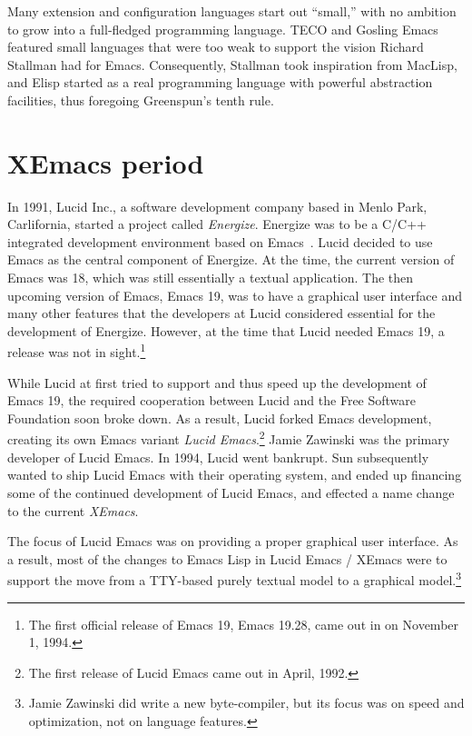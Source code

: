 \documentclass[format=acmsmall, review=false, screen=true]{acmart}
\newcommand \Elisp {Elisp}
\begin{document}

Many extension and configuration languages start out ``small,'' with
no ambition to grow into a full-fledged programming language.  TECO
and Gosling Emacs featured small languages that were too weak to
support the vision Richard Stallman had for Emacs.  Consequently,
Stallman took inspiration from MacLisp, and \Elisp{} started as a real
programming language with powerful abstraction facilities, thus
foregoing Greenspun's tenth rule.


\section{XEmacs period}         %

In 1991, Lucid Inc., a software development company based in Menlo
Park, Carlifornia, started a project called \textit{Energize}.
Energize was to be a C/C++ integrated development environment based on
Emacs~\cite{GabrielLetter}.  Lucid decided to use Emacs as the central
component of Energize.  At the time, the current version of Emacs was
18, which was still essentially a textual application.  The then
upcoming version of Emacs, Emacs 19, was to have a graphical user
interface and many other features that the developers at Lucid
considered essential for the development of Energize.  However, at the
time that Lucid needed Emacs 19, a release was not in
sight.\footnote{The first official release of Emacs 19, Emacs
  19.28, came out in on November 1, 1994.}

While Lucid at first tried to support and thus speed up the
development of Emacs 19, the required cooperation between Lucid and
the Free Software Foundation soon broke down.  As a result, Lucid
forked Emacs development, creating its own Emacs variant \textit{Lucid
Emacs}.\footnote{The first release of Lucid Emacs came out in April,
1992.}  Jamie Zawinski was the primary developer of Lucid Emacs.
In 1994, Lucid went bankrupt.  Sun subsequently wanted to ship
Lucid Emacs with their operating system, and ended up financing some
of the continued development of Lucid Emacs, and effected a name
change to the current \textit{XEmacs}.

The focus of Lucid Emacs was on providing a proper graphical user
interface.  As a result, most of the changes to Emacs Lisp in Lucid
Emacs / XEmacs were to support the move from a TTY-based purely
textual model to a graphical model.\footnote{Jamie Zawinski did write a new
  byte-compiler, but its focus was on speed and optimization, not on
  language features.}
\end{document}
